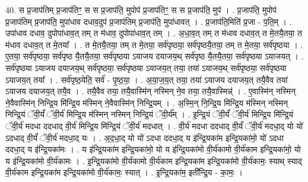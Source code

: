 \documentclass[17pt]{extarticle}
\begin{document}
40. स प्र॒जाप॑तिम् प्र॒जाप॑तिꣳ॒॒ स स प्र॒जाप॑ति॒ मुपोप॑ प्र॒जाप॑तिꣳ॒॒ स स प्र॒जाप॑ति॒ मुप॑ । . प्र॒जाप॑ति॒ मुपोप॑ प्र॒जाप॑तिम् प्र॒जाप॑ति॒ मुपा॑धाव दधाव॒दुप॑ प्र॒जाप॑तिम् प्र॒जाप॑ति॒ मुपा॑धावत् । . प्र॒जाप॑ति॒मिति॑ प्र॒जा - प॒ति॒म् । . उपा॑धाव दधाव॒ दुपोपा॑धाव॒त् तम् त म॑धाव॒ दुपोपा॑धाव॒त् तम् । . अ॒धा॒व॒त् तम् त म॑धाव दधाव॒त् त मे॒तयै॒तया॒ त म॑धाव दधाव॒त् त मे॒तया᳚ । . त मे॒तयै॒तया॒ तम् त मे॒तया॒ सर्व॑पृष्ठया॒ सर्व॑पृष्ठयै॒तया॒ तम् त मे॒तया॒ सर्व॑पृष्ठया । . ए॒तया॒ सर्व॑पृष्ठया॒ सर्व॑पृष्ठ यै॒तयै॒तया॒ सर्व॑पृष्ठया ऽयाजय दयाजय॒थ् सर्व॑पृष्ठ यै॒तयै॒तया॒ सर्व॑पृष्ठया ऽयाजयत् । . सर्व॑पृष्ठया ऽयाजय दयाजय॒थ् सर्व॑पृष्ठया॒ सर्व॑पृष्ठया ऽयाजय॒त् तया॒ तया॑ ऽयाजय॒थ् सर्व॑पृष्ठया॒ सर्व॑पृष्ठया ऽयाजय॒त् तया᳚ । . सर्व॑पृष्ठ॒येति॒ सर्व॑ - पृ॒ष्ठ॒या॒ । . अ॒या॒ज॒य॒त् तया॒ तया॑ ऽयाजय दयाजय॒त् तयै॒वैव तया॑ ऽयाजय दयाजय॒त् तयै॒व । . तयै॒वैव तया॒ तयै॒वास्मि॑न् नस्मिन् ने॒व तया॒ तयै॒वास्मिन्न्॑ । . ए॒वास्मि॑न् नस्मिन् ने॒वैवास्मि॑न् निन्द्रि॒य मि॑न्द्रि॒य म॑स्मिन् ने॒वैवास्मि॑न् निन्द्रि॒यम् । . अ॒स्मि॒न् नि॒न्द्रि॒य मि॑न्द्रि॒य म॑स्मिन् नस्मिन् निन्द्रि॒यं ॅवी॒र्यं॑ ॅवी॒र्य॑ मिन्द्रि॒य म॑स्मिन् नस्मिन् निन्द्रि॒यं ॅवी॒र्य᳚म् । . इ॒न्द्रि॒यं ॅवी॒र्यं॑ ॅवी॒र्य॑ मिन्द्रि॒य मि॑न्द्रि॒यं ॅवी॒र्य॑ मदधा ददधाद् वी॒र्य॑ मिन्द्रि॒य मि॑न्द्रि॒यं ॅवी॒र्य॑ मदधात् । . वी॒र्य॑ मदधा ददधाद् वी॒र्यं॑ ॅवी॒र्य॑ मदधा॒द् यो यो॑ ऽदधाद् वी॒र्यं॑ ॅवी॒र्य॑ मदधा॒द् यः । . अ॒द॒धा॒द् यो यो॑ ऽदधा ददधा॒द् य इ॑न्द्रि॒यका॑म इन्द्रि॒यका॑मो॒ यो॑ ऽदधा ददधा॒द् य इ॑न्द्रि॒यका॑मः । . य इ॑न्द्रि॒यका॑म इन्द्रि॒यका॑मो॒ यो य इ॑न्द्रि॒यका॑मो वी॒र्य॑कामो वी॒र्य॑काम इन्द्रि॒यका॑मो॒ यो य इ॑न्द्रि॒यका॑मो वी॒र्य॑कामः । . इ॒न्द्रि॒यका॑मो वी॒र्य॑कामो वी॒र्य॑काम इन्द्रि॒यका॑म इन्द्रि॒यका॑मो वी॒र्य॑कामः॒ स्याथ् स्याद् वी॒र्य॑काम इन्द्रि॒यका॑म इन्द्रि॒यका॑मो वी॒र्य॑कामः॒ स्यात् । . इ॒न्द्रि॒यका॑म॒ इती᳚न्द्रि॒य - का॒मः॒ । \newline
\pagebreak
{}
\end{document}
